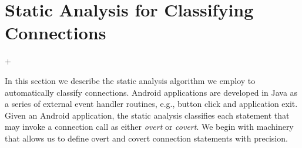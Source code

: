 \section{Static Analysis for Classifying Connections}
\label{sec:analysis}

\lstMakeShortInline[basicstyle=\scriptsize\ttfamily,keywordstyle=\color{DarkPurple},breaklines=false]+

In this section we describe the static analysis algorithm we employ to
automatically classify connections.  Android applications are
developed in Java as a series of external event handler routines,
e.g., button click and application exit.  Given an Android
application, the static analysis classifies each statement that may
invoke a connection call as either {\it overt} or {\it
  covert}.  We begin with machinery that allows us to define
overt and covert connection statements with precision.




